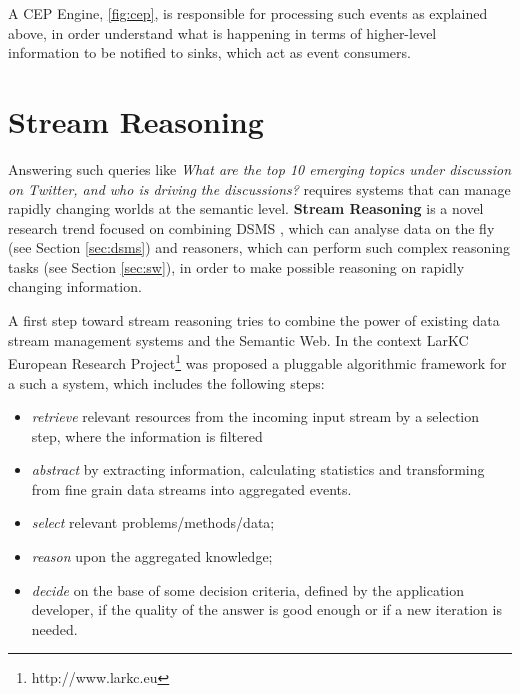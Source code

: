 A CEP Engine, \ref{fig:cep}, is responsible for processing such events as explained above, in order understand what is happening in terms of higher-level information to be notified to sinks, which act as event consumers.



\section{Stream Reasoning}\label{sec:sfp}

Answering such queries like \textit{What are the top 10 emerging topics under discussion on Twitter, and who is driving the discussions?} requires systems that can manage rapidly changing worlds at the semantic level. \textbf{Stream Reasoning} is a novel research trend focused on combining DSMS , which can analyse data on the fly (see Section \ref{sec:dsms}) and reasoners, which can perform such complex reasoning tasks (see Section \ref{sec:sw}), in order to make possible reasoning on rapidly changing information.

A first step toward stream reasoning \cite{DBLP:conf/fis/ValleCBBC08} tries to combine the power of existing data stream management systems and the Semantic Web. In the context LarKC European Research Project\footnote{http://www.larkc.eu} \cite{4597242, 4120457} was proposed a pluggable algorithmic framework for a such a system, which includes the following steps:
\begin{itemize}
\item[1.] \textit{retrieve} relevant resources from the incoming input stream by a selection step, where the information is filtered
\item[2.] \textit{abstract} by extracting information, calculating statistics and transforming from fine grain data streams into aggregated events.
\item[3.] \textit{select} relevant problems/methods/data;
\item[4.] \textit{reason} upon the aggregated knowledge; 
\item[5.] \textit{decide} on the base of some decision criteria, defined by the application developer, if the quality of the answer is good enough or if a new iteration is needed.
\end{itemize} 


